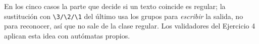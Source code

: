 En los cinco casos la parte que decide si un texto coincide es regular; la sustitución con \texttt{\textbackslash{}3/\textbackslash{}2/\textbackslash{}1} del último usa los grupos para \emph{escribir} la salida, no para reconocer, así que no sale de la clase regular. Los validadores del Ejercicio 4 aplican esta idea con autómatas propios.
